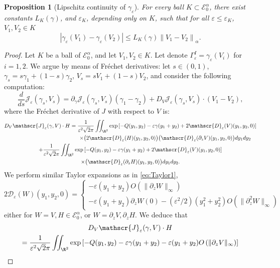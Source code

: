 \documentclass[10pt]{amsart}
\let\mathcal\mathscr
\theoremstyle{plain}
\newtheorem{prop}[thm]{Proposition}
\theoremstyle{definition}
\newcommand{\D}{\mathcal{D}_\eps}
\newcommand{\Je}{\mathcal{J}_\eps}
\let\eps\varepsilon
\newcommand{\abs}[1]{\left\lvert#1\right\rvert}
\newcommand{\nalph}[1]{\left\lVert#1\right\rVert_\alpha}
\newcommand{\Eaz}{\mathcal{E}^\alpha_0}
\newcommand{\Cgamma}{L_K(\gamma)}
\newcommand{\GammaI}{\Gamma^I_{\eps}}
\begin{document}
\begin{prop}[Lipschitz continuity of $\gamma_\eps$]\label{contraction gamma}
For every ball $K\subset \Eaz$, there exist constants $\Cgamma$, and $\eps_K $, depending only on $K$, such that for all $\eps \leq \eps_K$, $V_1, V_2 \in K$
\begin{equation*}
\abs{\gamma_\eps(V_1)-\gamma_\eps(V_2)} \leq \Cgamma \nalph{V_1-V_2}.
\end{equation*}
\end{prop}
\begin{proof}
Let $K$ be a ball of $\Eaz$, and let $V_1,V_2 \in K$. Let denote $\GammaI = \gamma_\eps(V_i)$ for $i = 1,2$.
We argue by means of Fréchet derivatives: let $s\in (0,1)$, $\gamma_s = s \gamma_1 + (1-s)\gamma_2$, $V_s = s V_1 + (1-s)V_2$, and consider the following computation:
\begin{equation}\label{eq:dsJ}
\dfrac{d}{ds} \Je(\gamma_s, V_s) = \partial_\gamma \Je(\gamma_s,V_s) (\gamma_1 - \gamma_2) + D_V \Je (\gamma_s,V_s)\cdot (V_1 - V_2),
\end{equation}
where the Fréchet derivative of $J$ with respect to $V$ is:
\begin{multline*}
D_V \Je(\gamma,V)\cdot H = \dfrac{1}{\eps^2\sqrt{2}\pi} \iint_{\R^2} \exp \left[-Q(y_1,y_2)- \eps \gamma (y_1+y_2) + 2 \D(V)(y_1,y_2,0) \right] \\
\shoveright{\times \bigl (2 \D(H)(y_1,y_2,0) \bigr) \bigl(\D(\partial_z V)(y_1,y_2,0) \bigr) d y_1 d y_2} \\ +
\dfrac{1}{\eps^2 \sqrt{2}\pi} \iint_{\R^2} \exp \left[-Q(y_1,y_2)- \eps \gamma (y_1+y_2) + 2 \D(V)(y_1,y_2,0) \right]\\
\times \bigl(\D(\partial_z H)(y_1,y_2,0) \bigr) d y_1 d y_2.
\end{multline*}
We perform similar Taylor expansions as in \eqref{eq:Taylor1},
\begin{equation*}
2 \D(W)(y_1,y_2,0) =
\begin{cases}
-\eps (y_1 + y_2) O\left (\|\partial_z W\|_\infty \right)\\
-\eps (y_1 + y_2)\partial_z W(0) - (\eps^2/2)\left (y_1^2 + y_2^2 \right) O\left (\|\partial_z^2 W\|_\infty \right)
\end{cases}
\end{equation*}
either for $W =V, H\in \Eaz$, or $W = \partial_z V, \partial_z H$. We deduce that
\begin{multline}\label{eq:DVJ}
D_V \Je(\gamma,V)\cdot H\\
= \dfrac{1}{\eps^2 \sqrt{2}\pi} \iint_{\R^2} \exp \left[-Q(y_1,y_2)- \eps \gamma (y_1+y_2) -\eps (y_1 + y_2) O\left (\|\partial_z V\|_\infty \right) \right] \\

\end{multline}
\end{proof}
\end{document}
